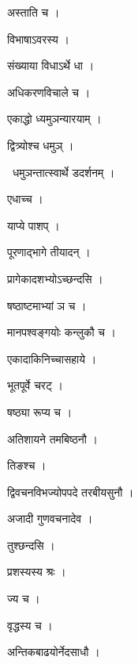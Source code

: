 \documentclass[10pt, openany, oneside]{book}
\begin{document}
\noindent अस्ताति च ।

\noindent विभाषाऽवरस्य ।

\noindent संख्याया विधाऽर्थे धा ।

\noindent अधिकरणविचाले च ।

\noindent एकाद्धो ध्यमुञन्यारयाम् ।

\noindent द्वित्र्योश्च धमुञ् ।

\par\noindent\hspace{1.5em}{\vps वा॰}~{\qt धमुञन्तात्स्वार्थे डदर्शनम् ।}

\noindent एधाच्च ।

\noindent याप्ये पाशप् ।

\noindent पूरणाद्भागे तीयादन् ।

\noindent प्रागेकादशभ्योऽच्छन्दसि ।

\noindent षष्ठाष्टमाभ्यां ञ च ।

\noindent मानपश्वङ्गयोः कन्लुकौ च ।

\noindent एकादाकिनिच्चासहाये ।

\noindent भूतपूर्वे चरट् ।

\noindent षष्ठ्या रूप्य च ।

\noindent अतिशायने तमबिष्ठनौ ।

\noindent तिङश्च ।

\noindent द्विवचनविभज्योपपदे तरबीयसुनौ ।

\noindent अजादी गुणवचनादेव ।

\noindent तुश्छन्दसि ।

\noindent प्रशस्यस्य श्रः ।

\noindent ज्य च ।

\noindent वृद्धस्य च ।

\noindent अन्तिकबाढयोर्नेदसाधौ ।
\end{document}
